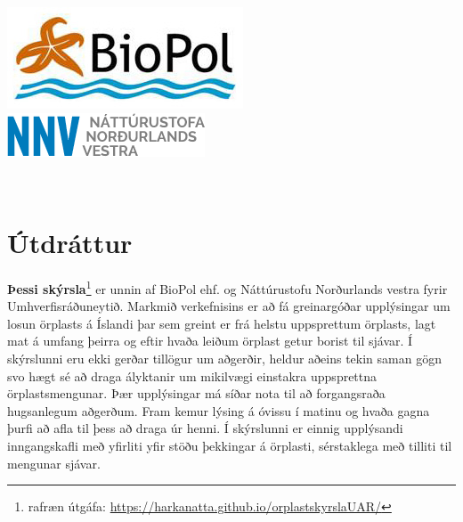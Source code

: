 \documentclass[icelandic,]{book}
\let\rmarkdownfootnote\footnote%
\def\footnote{\protect\rmarkdownfootnote}
\begin{document}
\begin{titlepage}
\begin{minipage}{0.3\textwidth}
\includegraphics{myndir/biopollogo.png}\\ %
\includegraphics{myndir/nnvlogo.png}\\ %
 \end{minipage}\\


\vfill %

\end{titlepage}
{
\tableofcontents
}
\listoftables
\listoffigures

\newpage
\hypertarget{utdrattur}{%
\section*{Útdráttur}\label{utdrattur}}
\pagestyle{plain}

\textbf{Þessi skýrsla}\footnote{rafræn útgáfa: \href{https://harkanatta.github.io/orplastskyrslaUAR/}{https://harkanatta.github.io/orplastskyrslaUAR/}} er unnin af BioPol ehf. og Náttúrustofu Norðurlands vestra fyrir Umhverfisráðuneytið. Markmið verkefnisins er að fá greinargóðar upplýsingar um losun örplasts á Íslandi þar sem greint er frá helstu uppsprettum örplasts, lagt mat á umfang þeirra og eftir hvaða leiðum örplast getur borist til sjávar. Í skýrslunni eru ekki gerðar tillögur um aðgerðir, heldur aðeins tekin saman gögn svo hægt sé að draga ályktanir um mikilvægi einstakra uppsprettna örplastsmengunar. Þær upplýsingar má síðar nota til að forgangsraða hugsanlegum aðgerðum. Fram kemur lýsing á óvissu í matinu og hvaða gagna þurfi að afla til þess að draga úr henni. Í skýrslunni er einnig upplýsandi inngangskafli með yfirliti yfir stöðu þekkingar á örplasti, sérstaklega með tilliti til mengunar sjávar.
\end{document}
